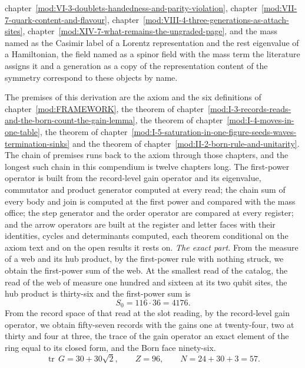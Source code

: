 \begin{chbridge}
chapter~\ref{mod:VI-3-doublets-handedness-and-parity-violation}, chapter~\ref{mod:VII-7-quark-content-and-flavour}, chapter~\ref{mod:VIII-4-three-generations-as-attach-sites}, chapter~\ref{mod:XIV-7-what-remains-the-ungraded-page}, and the mass named as the Casimir label of a Lorentz representation and the rest eigenvalue of a Hamiltonian, the field named as a spinor field with the mass term the literature assigns it and a generation as a copy of the representation content of the symmetry correspond to these objects by name.
\end{chbridge}
\begin{chproof}
The premises of this derivation are the axiom and the six definitions of chapter~\ref{mod:FRAMEWORK}, the theorem of chapter~\ref{mod:I-3-records-reads-and-the-born-count-the-gain-lemma}, the theorem of chapter~\ref{mod:I-4-moves-in-one-table}, the theorem of chapter~\ref{mod:I-5-saturation-in-one-figure-seeds-waves-termination-sinks} and the theorem of chapter~\ref{mod:II-2-born-rule-and-unitarity}. The chain of premises runs back to the axiom through those chapters, and the longest such chain in this compendium is twelve chapters long.
The first-power operator is built from the record-level gain operator and its eigenvalue, commutator and product generator computed at every read; the chain sum of every body and join is computed at the first power and compared with the mass office; the step generator and the order operator are compared at every register; and the arrow operators are built at the register and letter faces with their identities, cycles and determinants computed, each theorem conditional on the axiom text and on the open results it rests on.
\textit{The exact part.}
From the measure of a web and its hub product, by the first-power rule with nothing struck, we obtain the first-power sum of the web. At the smallest read of the catalog, the read of the web of measure one hundred and sixteen at its two qubit sites, the hub product is thirty-six and the first-power sum is
\begin{equation}
S_{0} = 116 \cdot 36 = 4176 .
\end{equation}
From the record space of that read at the slot reading, by the record-level gain operator, we obtain fifty-seven records with the gains one at twenty-four, two at thirty and four at three, the trace of the gain operator an exact element of the ring equal to its closed form, and the Born face ninety-six.
\begin{equation}
\operatorname{tr}\, G = 30 + 30\sqrt{2}, \qquad Z = 96, \qquad N = 24 + 30 + 3 = 57 .

\end{equation}
\end{chproof}
